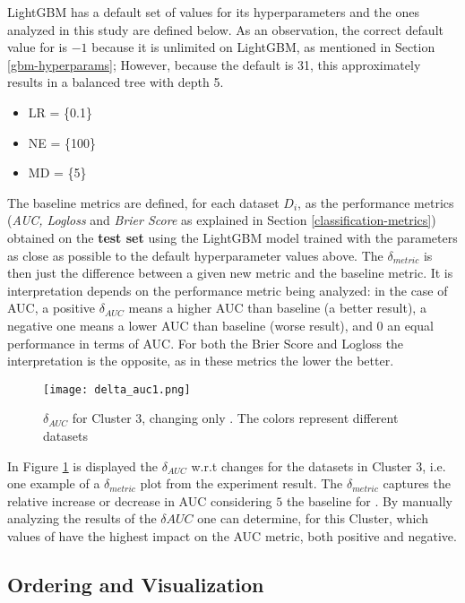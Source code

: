 LightGBM has a default set of values for its hyperparameters and the ones analyzed in this study  are defined below. As an observation, the correct default value for  is $-1$ because it is unlimited on LightGBM, as mentioned in Section \ref{gbm-hyperparams}; However, because the  default is 31, this approximately results in a balanced tree with depth 5.

\begin{itemize}
    \item LR = \{0.1\}
    \item NE = \{100\}
    \item MD = \{5\}
\end{itemize}

The baseline metrics are defined, for each dataset $D_i$, as the performance metrics (\textit{AUC, Logloss} and \textit{Brier Score} as explained in Section \ref{classification-metrics}) obtained on the {\Large\textbf{test set}} using the LightGBM model trained with the parameters as close as possible to the default hyperparameter values above. The $\delta_{metric}$ is then just the difference between a given new metric and the baseline metric. It is interpretation depends on the performance metric being analyzed: in the case of AUC, a positive $\delta_{AUC}$ means a higher AUC than baseline (a better result), a negative one means a lower AUC than baseline (worse result), and $0$ an equal performance in terms of AUC. For both the Brier Score and Logloss the interpretation is the opposite, as in these metrics the lower the better.

\begin{figure}[!h]
    \centering
    \texttt{[image: delta\_auc1.png]}
    \caption{$\delta_{AUC}$ for Cluster 3, changing only . The colors represent different datasets}
    \label{fig:delta-auc1}
\end{figure}

In Figure \ref{fig:delta-auc1} is displayed the $\delta_{AUC}$ w.r.t  changes for the datasets in Cluster 3, i.e. one example of a $\delta_{metric}$ plot from the experiment result. The $\delta_{metric}$ captures the relative increase or decrease in AUC considering $5$ the baseline for . By manually analyzing the results of the $\delta{AUC}$ one can determine, for this Cluster, which values of  have the highest impact on the AUC metric, both positive and negative.

\subsection{Ordering and Visualization}
\label{subsec:ordering}

